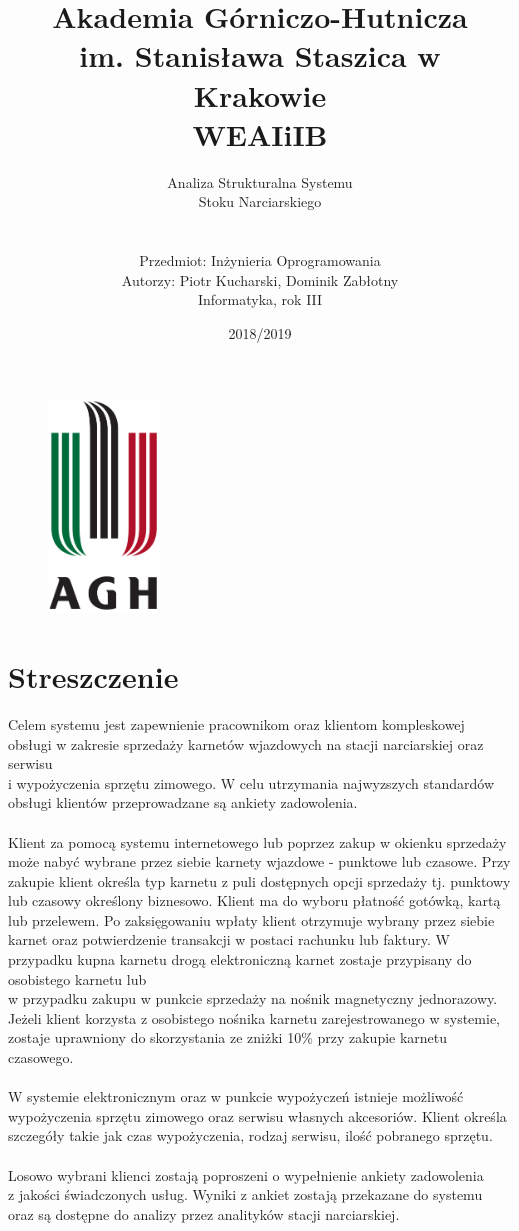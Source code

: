 \documentclass{article}
\title{\huge Akademia Górniczo-Hutnicza \\ im. Stanisława Staszica w Krakowie \\ \Large WEAIiIB}
\author{\huge Analiza Strukturalna Systemu \\ \huge Stoku Narciarskiego \\ \\ \\ \LARGE Przedmiot: Inżynieria Oprogramowania \\ \Large Autorzy: Piotr Kucharski, Dominik Zabłotny \\ Informatyka, rok III}
\date{2018/2019}
\begin{document}
\begin{figure}
\centering
\includegraphics[width=3cm]{agh.png}
\label{fig: agh}
\end{figure}

\maketitle

\newpage
\tableofcontents
\newpage
\section{Streszczenie}
\large{
Celem systemu jest zapewnienie pracownikom oraz klientom kompleskowej obsługi w zakresie sprzedaży karnetów wjazdowych na stacji narciarskiej oraz serwisu \\ i wypożyczenia sprzętu zimowego. W celu utrzymania najwyzszych standardów obsługi klientów przeprowadzane są ankiety zadowolenia. \\ \\ Klient za pomocą systemu internetowego lub poprzez zakup w okienku sprzedaży może nabyć wybrane przez siebie karnety wjazdowe - punktowe lub czasowe. Przy zakupie klient określa typ karnetu z puli dostępnych opcji sprzedaży tj. punktowy lub czasowy określony biznesowo. Klient ma do wyboru płatność gotówką, kartą lub przelewem. Po zaksięgowaniu wpłaty klient otrzymuje wybrany przez siebie karnet oraz potwierdzenie transakcji w postaci rachunku lub faktury. W przypadku kupna karnetu drogą elektroniczną karnet zostaje przypisany do osobistego karnetu lub \\ w przypadku zakupu w punkcie sprzedaży na nośnik magnetyczny jednorazowy. Jeżeli klient korzysta z osobistego nośnika karnetu zarejestrowanego w systemie, zostaje uprawniony do skorzystania ze zniżki 10\% przy zakupie karnetu czasowego. \\ \\ W systemie elektronicznym oraz w punkcie wypożyczeń istnieje możliwość \\ wypożyczenia sprzętu zimowego oraz serwisu własnych akcesoriów. Klient określa szczegóły takie jak czas wypożyczenia, rodzaj serwisu, ilość pobranego sprzętu. \\ \\ Losowo wybrani klienci zostają poproszeni o wypełnienie ankiety zadowolenia \\ z jakości świadczonych usług. Wyniki z ankiet zostają przekazane do systemu oraz są dostępne do analizy przez analityków stacji narciarskiej.}
\end{document}
